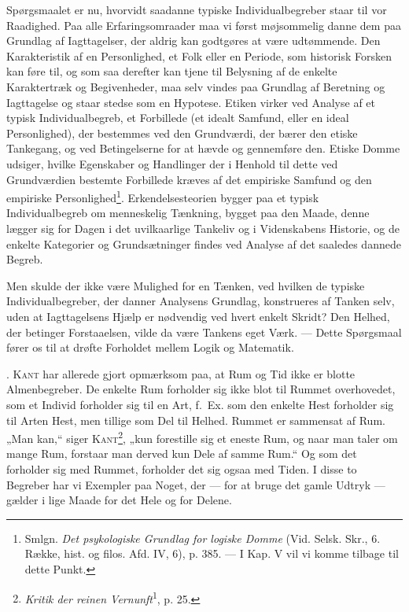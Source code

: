 \documentclass[12pt]{article}
\begin{document}
Spørgsmaalet er nu, hvorvidt saadanne typiske Individualbegreber staar til
vor Raadighed. Paa alle Erfaringsomraader maa vi først møjsommelig danne dem
paa Grundlag af Iagttagelser, der aldrig kan godtgøres at være udtømmende. Den
Karakteristik af en Personlighed, et Folk eller en Periode, som historisk Forsken
kan føre til, og som saa derefter kan tjene til Belysning af de enkelte
Karaktertræk og Begivenheder, maa selv vindes paa Grundlag af Beretning og Iagttagelse
og staar stedse som en Hypotese. Etiken virker ved Analyse af et typisk
Individualbegreb, et Forbillede (et idealt Samfund, eller en ideal Personlighed), der
bestemmes ved den Grundværdi, der bærer den etiske Tankegang, og ved
Betingelserne for at hævde og gennemføre den. Etiske Domme udsiger, hvilke Egenskaber
og Handlinger der i Henhold til dette ved Grundværdien bestemte Forbillede kræves
af det empiriske Samfund og den empiriske Personlighed\footnote{Smlgn. \textit{Det
psykologiske Grundlag for logiske Domme} (Vid. Selsk. Skr., 6. Række, hist. og
filos. Afd. IV, 6), p. 385. --- I Kap. V vil vi komme tilbage til dette Punkt.}.
Erkendelsesteorien
bygger paa et typisk Individualbegreb om menneskelig Tænkning, bygget paa den
Maade, denne lægger sig for Dagen i det uvilkaarlige Tankeliv og i Videnskabens
Historie, og de enkelte Kategorier og Grundsætninger findes ved Analyse af det
saaledes dannede Begreb.

Men skulde der ikke være Mulighed for en Tænken, ved hvilken de typiske
Individualbegreber, der danner Analysens Grundlag, konstrueres af Tanken selv,
uden at Iagttagelsens Hjælp er nødvendig ved hvert enkelt Skridt? Den Helhed,
der betinger Forstaaelsen, vilde da være Tankens eget Værk. --- Dette Spørgsmaal
fører os til at drøfte Forholdet mellem Logik og Matematik.

. \textsc{Kant} har allerede gjort opmærksom paa, at Rum og Tid ikke er blotte
Almenbegreber. De enkelte Rum forholder sig ikke blot til Rummet overhovedet,
som et Individ forholder sig til en Art, f.~Ex. som den enkelte Hest forholder sig til
Arten Hest, men tillige som Del til Helhed. Rummet er sammensat af Rum. „Man
kan,“ siger \textsc{Kant}\footnote{\textit{Kritik der reinen
Vernunft}\textsuperscript{1}, p. 25.}, „kun forestille sig et eneste Rum, og naar
man taler om mange Rum, forstaar man derved kun Dele af samme Rum.“ Og som det
forholder sig med Rummet, forholder det sig ogsaa med Tiden. I disse to Begreber har vi
Exempler paa Noget, der --- for at bruge det gamle Udtryk --- gælder i lige Maade
for det Hele og for Delene.
\end{document}
